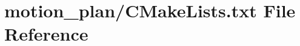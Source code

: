\hypertarget{motion__plan_2CMakeLists_8txt}{}\section{motion\+\_\+plan/\+C\+Make\+Lists.txt File Reference}
\label{motion__plan_2CMakeLists_8txt}
